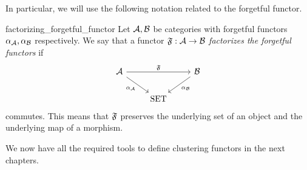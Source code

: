 In particular, we will use the following notation related to the forgetful functor.

\begin{notation}{}{factorizing_forgetful_functor}
Let $\mathcal{A}, \mathcal{B}$ be categories with forgetful functors $\alpha_{\mathcal{A}}, \alpha_{\mathcal{B}}$ respectively. We say that a functor $\mathfrak{F}: \mathcal{A} \to \mathcal{B}$ \emph{factorizes the forgetful functors} if
\begin{equation*}
    \begin{tikzcd}
        \A \arrow[rr, "\mathfrak{F}"] \arrow[dr, "\alpha_\A"'] & & \B \arrow[dl, "\alpha_\B"] \\
        & \mathrm{SET} &
      \end{tikzcd}
\end{equation*}
commutes. This means that $\mathfrak{F}$ preserves the underlying set of an object and the underlying map of a morphism.
\end{notation}

\medskip We now have all the required tools to define clustering functors in the next chapters.